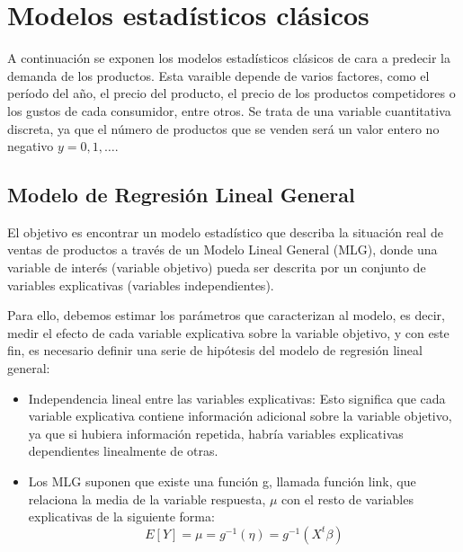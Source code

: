 \documentclass[12pt,a4paper,]{book}
\title{}
\author{Nombre Completo Autor}
\date{27/10/2017}
\def\ifdoblecara{} %
\def\ifprincipal{} %
\let\ifprincipal\undefined %
\numberwithin{dummy}{section}
\theoremstyle{ocrenumbox}
\theoremstyle{blacknumex}
\theoremstyle{blacknumbox}
\theoremstyle{ocrenum}
\theoremstyle{ocrenum}
\begin{document}
\raggedbottom

\ifdefined\ifprincipal
\else
\setlength{\parindent}{1em}
\pagestyle{fancy}
\setcounter{tocdepth}{4}
\tableofcontents

\fi

\ifdefined\ifdoblecara
\fancyhead{}{}
\fancyhead[LE,RO]{\scriptsize\rightmark}
\fancyfoot[LO,RE]{\scriptsize\slshape \leftmark}
\fancyfoot[C]{}
\fancyfoot[LE,RO]{\footnotesize\thepage}
\else
\fancyhead{}{}
\fancyhead[RO]{\scriptsize\rightmark}
\fancyfoot[LO]{\scriptsize\slshape \leftmark}
\fancyfoot[C]{}
\fancyfoot[RO]{\footnotesize\thepage}
\fi
\renewcommand{\headrulewidth}{0.4pt}
\renewcommand{\footrulewidth}{0.4pt}

\hypertarget{modelos-estaduxedsticos-cluxe1sicos}{%
\chapter{Modelos estadísticos
clásicos}\label{modelos-estaduxedsticos-cluxe1sicos}}

A continuación se exponen los modelos estadísticos clásicos de cara a
predecir la demanda de los productos. Esta varaible depende de varios
factores, como el período del año, el precio del producto, el precio de
los productos competidores o los gustos de cada consumidor, entre otros.
Se trata de una variable cuantitativa discreta, ya que el número de
productos que se venden será un valor entero no negativo
\(y=0,1,\dots\).

\hypertarget{modelo-de-regresiuxf3n-lineal-general}{%
\section{Modelo de Regresión Lineal
General}\label{modelo-de-regresiuxf3n-lineal-general}}

El objetivo es encontrar un modelo estadístico que describa la situación
real de ventas de productos a través de un Modelo Lineal General (MLG),
donde una variable de interés (variable objetivo) pueda ser descrita por
un conjunto de variables explicativas (variables independientes).

Para ello, debemos estimar los parámetros que caracterizan al modelo, es
decir, medir el efecto de cada variable explicativa sobre la variable
objetivo, y con este fin, es necesario definir una serie de hipótesis
del modelo de regresión lineal general:

\begin{itemize}
\item
  Independencia lineal entre las variables explicativas: Esto significa
  que cada variable explicativa contiene información adicional sobre la
  variable objetivo, ya que si hubiera información repetida, habría
  variables explicativas dependientes linealmente de otras.
\item
  Los MLG suponen que existe una función g, llamada función link, que
  relaciona la media de la variable respuesta, \(\mu\) con el resto de
  variables explicativas de la siguiente forma:
  \[E[Y]= \mu = g^{-1}(\eta) = g^{-1}(X^t\beta)\]
\end{itemize}
\end{document}
